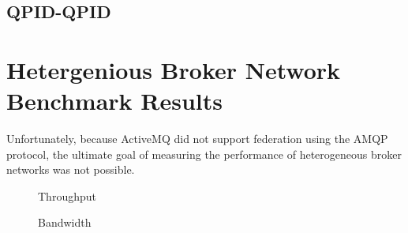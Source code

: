 \documentclass{thesis}
\begin{document}
\subsection{QPID-QPID}

\section{Hetergenious Broker Network Benchmark Results}
Unfortunately, because ActiveMQ did not support federation using the AMQP protocol, the ultimate goal of measuring the performance of heterogeneous broker networks was not possible.

\begin{figure}[tb] 
\centering
\caption{Throughput}
\label{throughput}
\end{figure}

\begin{figure}[tb] 
\centering
\caption{Bandwidth}
\label{bandwidth}
\end{figure}
\end{document}
